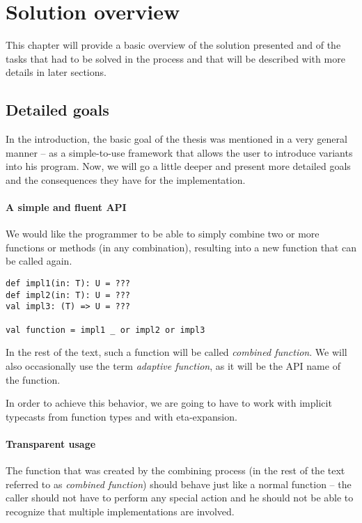 \chapter{Solution overview}

This chapter will provide a basic overview of the solution presented and of the tasks that had to be solved in the process and that will be described with more details in later sections.


\section{Detailed goals}
\label{sec:goals_revisited}

In the introduction, the basic goal of the thesis was mentioned in a very general manner -- as a simple-to-use framework that allows the user to introduce variants into his program. Now, we will go a little deeper and present more detailed goals and the consequences they have for the implementation.

\subsubsection{A simple and fluent API}

We would like the programmer to be able to simply combine two or more functions or methods (in any combination), resulting into a new function that can be called again.

\lstset{style=Scala}
\begin{lstlisting}
def impl1(in: T): U = ???
def impl2(in: T): U = ???
val impl3: (T) => U = ???

val function = impl1 _ or impl2 or impl3
\end{lstlisting}

In the rest of the text, such a function will be called \textit{combined function}. We will also occasionally use the term \textit{adaptive function}, as it will be the API name of the function.

In order to achieve this behavior, we are going to have to work with implicit typecasts from function types and with eta-expansion.

\subsubsection{Transparent usage}

The function that was created by the combining process (in the rest of the text referred to as \textit{combined function}) should behave just like a normal function -- the caller should not have to perform any special action and he should not be able to recognize that multiple implementations are involved.

